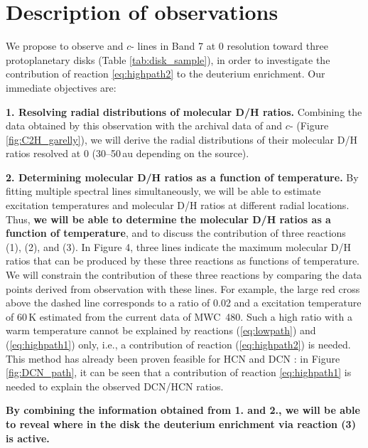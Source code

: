 \documentclass[12pt,a4paper]{article}  %
\begin{document}
\section{Description of observations}
We propose to observe  and $c$- lines in Band 7 at 0 resolution toward three protoplanetary disks (Table \ref{tab:disk_sample}), in order to investigate the contribution of reaction \eqref{eq:highpath2} to the deuterium enrichment. Our immediate objectives are:

\textbf{1. Resolving radial distributions of molecular D/H ratios.} Combining the data obtained by this observation with the archival data of  and $c$- (Figure \ref{fig:C2H_garelly}), we will derive the radial distributions of their molecular D/H ratios resolved at 0 (30--50\,au depending on the source).

\textbf{2. Determining molecular D/H ratios as a function of temperature.} By fitting multiple spectral lines simultaneously, we will be able to estimate excitation temperatures and molecular D/H ratios at different radial locations. Thus, \textbf{we will be able to determine the molecular D/H ratios as a function of temperature}, and to discuss the contribution of three reactions (1), (2), and (3). In Figure 4, three lines indicate the maximum molecular D/H ratios that can be produced by these three reactions as functions of temperature. We will constrain the contribution of these three reactions by comparing the data points derived from observation with these lines. For example, the large red cross above the dashed line corresponds to a  ratio of 0.02 and a  excitation temperature of 60\,K estimated from the current data of MWC~480. Such a high ratio with a warm temperature cannot be explained by reactions (\ref{eq:lowpath}) and (\ref{eq:highpath1}) only, i.e., a contribution of reaction (\ref{eq:highpath2}) is needed. This method has already been proven feasible for HCN and DCN \citep{Cataldi21}: in Figure \ref{fig:DCN_path}, it can be seen that a contribution of reaction \eqref{eq:highpath1} is needed to explain the observed DCN/HCN ratios.

\textbf{By combining the information obtained from 1. and 2., we will be able to reveal where in the disk the deuterium enrichment via reaction (3) is active.}
\end{document}
